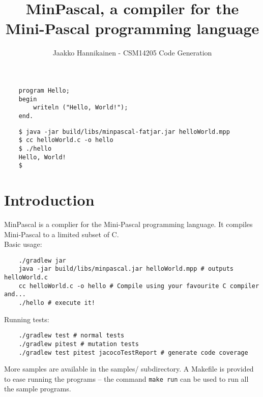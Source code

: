 \documentclass{article}
\author{Jaakko Hannikainen - CSM14205 Code Generation}
\title{MinPascal, a compiler for the Mini-Pascal programming language}
\def\pascallexer{pascal.py:DelphiLexer -x}
\begin{document}
\maketitle

\noindent
\begin{minipage}{0.35\textwidth}
\begin{verbatim}
    program Hello;
    begin
        writeln ("Hello, World!");
    end.
\end{verbatim}
\end{minipage}
\begin{minipage}{0.54\textwidth}
\begin{verbatim}
    $ java -jar build/libs/minpascal-fatjar.jar helloWorld.mpp
    $ cc helloWorld.c -o hello
    $ ./hello
    Hello, World!
    $
\end{verbatim}
\end{minipage}

\section{Introduction}
MinPascal is a complier for the Mini-Pascal programming language. It
compiles Mini-Pascal to a limited subset of C. \\[1.5em]

\noindent
Basic usage:
\begin{verbatim}
    ./gradlew jar
    java -jar build/libs/minpascal.jar helloWorld.mpp # outputs helloWorld.c
    cc helloWorld.c -o hello # Compile using your favourite C compiler and...
    ./hello # execute it!
\end{verbatim}

\noindent
Running tests:
\begin{verbatim}
    ./gradlew test # normal tests
    ./gradlew pitest # mutation tests
    ./gradlew test pitest jacocoTestReport # generate code coverage
\end{verbatim}

\noindent
More samples are available in the samples/ subdirectory. A Makefile is provided
to ease running the programs -- the command \texttt{make run} can be used to
run all the sample programs.

\newpage
\end{document}
